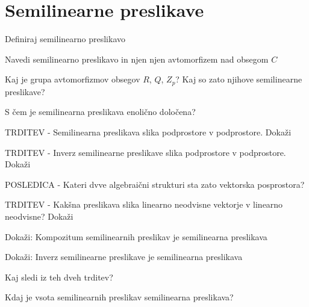 \documentclass{article}
\begin{document}
    \section{Semilinearne preslikave}
    \begin{enumerate}
        \item Definiraj semilinearno preslikavo
        \item Navedi semilinearno preslikavo in njen njen avtomorfizem nad obsegom $C$
        \item Kaj je grupa avtomorfizmov obsegov $R$, $Q$, $Z_p$? Kaj so zato njihove semilinearne preslikave?
        \item S čem je semilinearna preslikava enolično določena?
        {\color{blue}\item TRDITEV - Semilinearna preslikava slika podprostore v podprostore. Dokaži}
        {\color{red}\item TRDITEV - Inverz semilinearne preslikave slika podprostore v podprostore. Dokaži}
        {\color{red}\item POSLEDICA - Kateri dvve algebraični strukturi sta zato vektorska posprostora?}
        \item TRDITEV - Kakšna preslikava slika linearno neodvisne vektorje v linearno neodvisne? Dokaži
        \item Dokaži: Kompozitum semilinearnih preslikav je semilinearna preslikava
        \item Dokaži: Inverz semilinearne preslikave je semilinearna preslikava
        {\color{red}\item Kaj sledi iz teh dveh trditev?}
        {\color{red}\item Kdaj je vsota semilinearnih preslikav semilinearna preslikava?}
    \end{enumerate}
\end{document}
